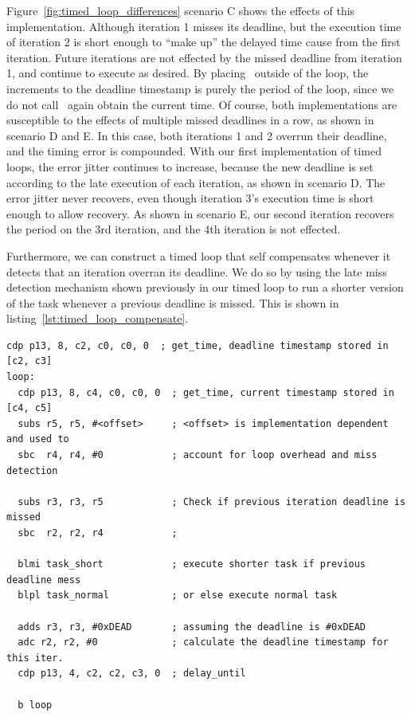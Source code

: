 Figure~\ref{fig:timed_loop_differences} scenario C shows the effects of this implementation. 
Although iteration 1 misses its deadline, but the execution time of iteration 2 is short enough to ``make up'' the delayed time cause from the first iteration.
Future iterations are not effected by the missed deadline from iteration 1, and continue to execute as desired.
By placing \gettime\ outside of the loop, the increments to the deadline timestamp is purely the period of the loop, since we do not call \gettime\ again obtain the current time.
Of course, both implementations are susceptible to the effects of multiple missed deadlines in a row, as shown in scenario D and E.
In this case, both iterations 1 and 2 overrun their deadline, and the timing error is compounded.
With our first implementation of timed loops, the error jitter continues to increase, because the new deadline is set according to the late execution of each iteration, as shown in scenario D. 
The error jitter never recovers, even though iteration 3's execution time is short enough to allow recovery. 
As shown in scenario E, our second iteration recovers the period on the 3rd iteration, and the 4th iteration is not effected. 

Furthermore, we can construct a timed loop that self compensates whenever it detects that an iteration overran its deadline. 
We do so by using the late miss detection mechanism shown previously in our timed loop to run a shorter version of the task whenever a previous deadline is missed.
This is shown in listing~\ref{lst:timed_loop_compensate}. 
\begin{lstlisting}[float=h, label=lst:timed_loop_compensate,caption=Timed loops with compensation ]
  cdp p13, 8, c2, c0, c0, 0  ; get_time, deadline timestamp stored in [c2, c3]
loop:
  cdp p13, 8, c4, c0, c0, 0  ; get_time, current timestamp stored in [c4, c5]
  subs r5, r5, #<offset>     ; <offset> is implementation dependent and used to 
  sbc  r4, r4, #0            ; account for loop overhead and miss detection

  subs r3, r3, r5            ; Check if previous iteration deadline is missed
  sbc  r2, r2, r4            ; 

  blmi task_short            ; execute shorter task if previous deadline mess 
  blpl task_normal           ; or else execute normal task 
  
  adds r3, r3, #0xDEAD       ; assuming the deadline is #0xDEAD
  adc r2, r2, #0             ; calculate the deadline timestamp for this iter.
  cdp p13, 4, c2, c2, c3, 0  ; delay_until
   
  b loop
\end{lstlisting}

